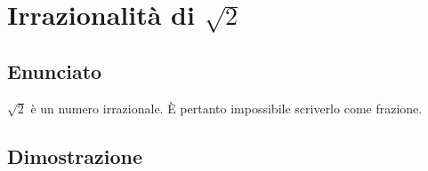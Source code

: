\documentclass[../../dimostrazioni]{subfiles}
\begin{document}
    \chapter{Irrazionalità di \texorpdfstring{\(\sqrt{2}\)}{radice di due}}

        \section*{Enunciato}

            \(\sqrt{2}\) è un numero irrazionale. È pertanto impossibile scriverlo come frazione.

        \section*{Dimostrazione}
\end{document}
